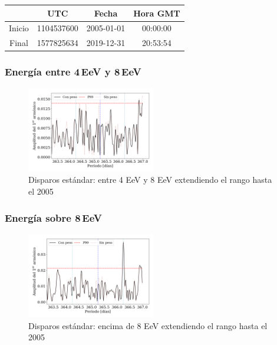 	\begin{table}[H]
	\centering
		\begin{tabular}{c|c|c|c}
	 		& UTC 			& Fecha		 	&  Hora GMT  \\ \hline
	Inicio	& 1104537600	&2005-01-01 	&00:00:00		\\
	Final 	& 1577825634	&2019-12-31 	&20:53:54		\\
		\end{tabular}
	\end{table}


\subsubsection{Energía entre 4\,EeV y 8\,EeV}

\begin{figure}[H]
	\centering
	\includegraphics[width=0.5\textwidth]{Graficos/2019_Main_Array_4_8_EeV_con_vs_sin_peso_extended.png}
	\caption{Disparos estándar: entre 4 EeV y 8 EeV extendiendo el rango hasta el 2005}
	\label{fig:48w_extended}
\end{figure}

\subsubsection{Energía sobre 8\,EeV}


\begin{figure}[H]
	\centering
	\includegraphics[width=0.5\textwidth]{Graficos/2019_Main_Array_8_EeV_con_vs_sin_peso_extended.png}
	\caption{Disparos estándar: encima de 8 EeV extendiendo el rango hasta el 2005}
	\label{fig:8w_extended}
\end{figure}

